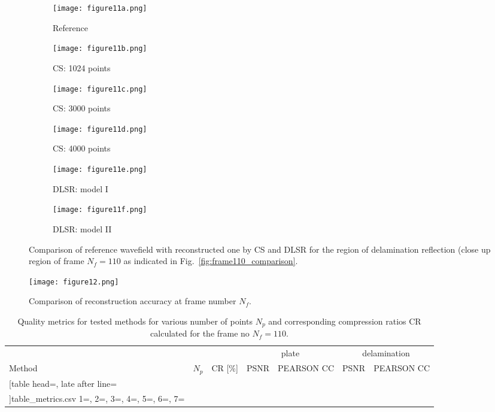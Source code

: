 \begin{figure} [h!]
	\centering
	\begin{subfigure}[b]{0.32\textwidth}
		\centering
		\texttt{[image: figure11a.png]}
		\caption{Reference}
		\label{fig:frame110delam_ref}
	\end{subfigure}
	\hfill
	\begin{subfigure}[b]{0.32\textwidth}
		\centering
		\texttt{[image: figure11b.png]}
		\caption{CS: 1024 points}
		\label{fig:frame110delam_CS1024}
	\end{subfigure}
	\hfill
	\begin{subfigure}[b]{0.32\textwidth}
		\centering
		\texttt{[image: figure11c.png]}
		\caption{CS: 3000 points}
		\label{fig:frame110delam_CS3000}
	\end{subfigure}	
	\hfill
	\begin{subfigure}[b]{0.32\textwidth}
		\centering
		\texttt{[image: figure11d.png]}
		\caption{CS: 4000 points}
		\label{fig:frame110delam_CS4000}
	\end{subfigure}
	\hfill
	\begin{subfigure}[b]{0.32\textwidth}
		\centering
		\texttt{[image: figure11e.png]}
		\caption{DLSR: model I}
		\label{fig:frame110delam_Abdalraheem}
	\end{subfigure}
	\hfill
	\begin{subfigure}[b]{0.32\textwidth}
		\centering
		\texttt{[image: figure11f.png]}
		\caption{DLSR: model II}
		\label{fig:frame110delam_Saeed}
	\end{subfigure}
	
	\caption{Comparison of reference wavefield with reconstructed one by CS and DLSR for the region of delamination reflection (close up region of frame $N_f = 110$ as indicated in Fig.~\ref{fig:frame110_comparison}.}
	\label{fig:frame110del_comparison}
\end{figure} 
\clearpage
\begin{figure} [h!]
	\centering
 	\texttt{[image: figure12.png]}
	\caption{Comparison of reconstruction accuracy at frame number $N_f$.}
	\label{fig:frame_metrics}
\end{figure}

\begin{table}[h!]
	\renewcommand{\arraystretch}{1.3}
	\centering \footnotesize
	\caption{Quality metrics for tested methods for various number of points $N_p$ and corresponding compression ratios CR calculated for the frame no $N_f=110$.}	
	\begin{tabular}{lrrrcrc} 
		\toprule
		& & & \multicolumn{2}{c}{plate} & \multicolumn{2}{c}{delamination} \\
		\cmidrule(lr){4-5} \cmidrule(lr){6-7}
		Method & $N_p$ & CR [\%] & PSNR & PEARSON CC& PSNR & PEARSON CC \\
		\midrule
		\csvreader
		[table head=\toprule,
		late after line=\\ 
		]{table_metrics.csv}{
		1=\one, 2=\two, 3=\three, 4=\four, 5=\five, 6=\six, 7=\seven
		}%
		{\one & \two & \three & \four & \five & \six & \seven }%
		\bottomrule
	\end{tabular}	
	\label{tab:csv_results}
\end{table}